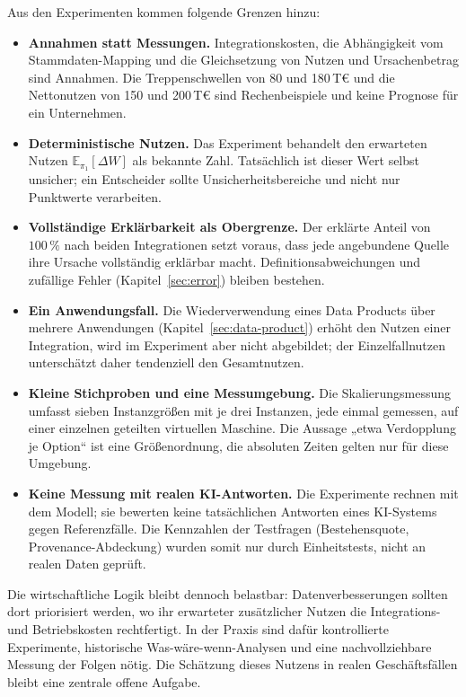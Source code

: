 \documentclass[a4paper,12pt,twoside]{report}
\theoremstyle{definition}
\newcommand{\E}{\mathbb{E}}
\begin{document}
Aus den Experimenten kommen folgende Grenzen hinzu:
\begin{itemize}
\item \textbf{Annahmen statt Messungen.} Integrationskosten, die Abhängigkeit vom Stammdaten-Mapping und die Gleichsetzung von Nutzen und Ursachenbetrag sind Annahmen. Die Treppenschwellen von 80 und 180\,T€ und die Nettonutzen von 150 und 200\,T€ sind Rechenbeispiele und keine Prognose für ein Unternehmen.
\item \textbf{Deterministische Nutzen.} Das Experiment behandelt den erwarteten Nutzen $\E_{\pi_1}[\Delta W]$ als bekannte Zahl. Tatsächlich ist dieser Wert selbst unsicher; ein Entscheider sollte Unsicherheitsbereiche und nicht nur Punktwerte verarbeiten.
\item \textbf{Vollständige Erklärbarkeit als Obergrenze.} Der erklärte Anteil von $100\,\%$ nach beiden Integrationen setzt voraus, dass jede angebundene Quelle ihre Ursache vollständig erklärbar macht. Definitionsabweichungen und zufällige Fehler (Kapitel~\ref{sec:error}) bleiben bestehen.
\item \textbf{Ein Anwendungsfall.} Die Wiederverwendung eines Data Products über mehrere Anwendungen (Kapitel~\ref{sec:data-product}) erhöht den Nutzen einer Integration, wird im Experiment aber nicht abgebildet; der Einzelfallnutzen unterschätzt daher tendenziell den Gesamtnutzen.
\item \textbf{Kleine Stichproben und eine Messumgebung.} Die Skalierungsmessung umfasst sieben Instanzgrößen mit je drei Instanzen, jede einmal gemessen, auf einer einzelnen geteilten virtuellen Maschine. Die Aussage „etwa Verdopplung je Option“ ist eine Größenordnung, die absoluten Zeiten gelten nur für diese Umgebung.
\item \textbf{Keine Messung mit realen KI-Antworten.} Die Experimente rechnen mit dem Modell; sie bewerten keine tatsächlichen Antworten eines KI-Systems gegen Referenzfälle. Die Kennzahlen der Testfragen (Bestehensquote, Provenance-Abdeckung) wurden somit nur durch Einheitstests, nicht an realen Daten geprüft.
\end{itemize}

Die wirtschaftliche Logik bleibt dennoch belastbar: Datenverbesserungen sollten dort priorisiert werden, wo ihr erwarteter zusätzlicher Nutzen die Integrations- und Betriebskosten rechtfertigt. In der Praxis sind dafür kontrollierte Experimente, historische Was-wäre-wenn-Analysen und eine nachvollziehbare Messung der Folgen nötig. Die Schätzung dieses Nutzens in realen Geschäftsfällen bleibt eine zentrale offene Aufgabe.
\end{document}
